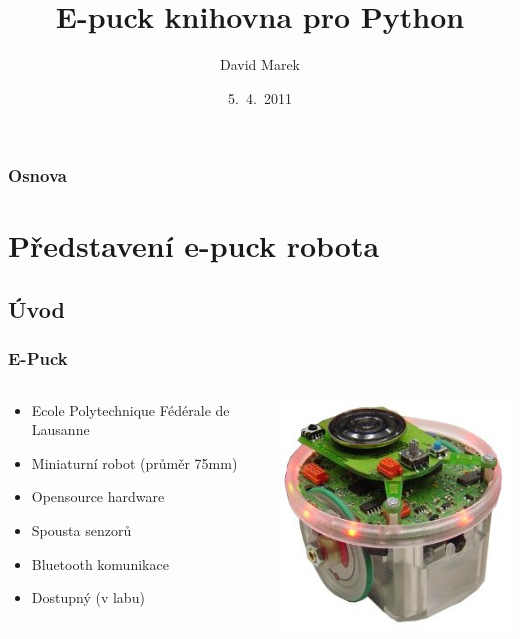 \documentclass{beamer}
\title{E-puck knihovna pro Python}
\author{David Marek}
\institute[MFF UK]{Univerzita Karlova v Praze}
\date{5.~4.~2011}
\begin{document}
\begin{frame}
    \titlepage
\end{frame}

\begin{frame}
    \frametitle{Osnova}
    \tableofcontents
\end{frame}

\section{Představení e-puck robota}

\subsection{Úvod}

\begin{frame}
    \frametitle{E-Puck}
    \begin{columns}
        \begin{column}{.6\textwidth}
            \begin{itemize}
                \item Ecole Polytechnique Fédérale de Lausanne
                \item Miniaturní robot (průměr 75mm)
                \item Opensource hardware
                \item Spousta senzorů
                \item Bluetooth komunikace
                \item Dostupný (v labu)
            \end{itemize}
        \end{column}

        \begin{column}{.4\textwidth}
            \includegraphics[scale=0.4]{e-puck.jpg}
        \end{column}
    \end{columns}
\end{frame}
\end{document}
